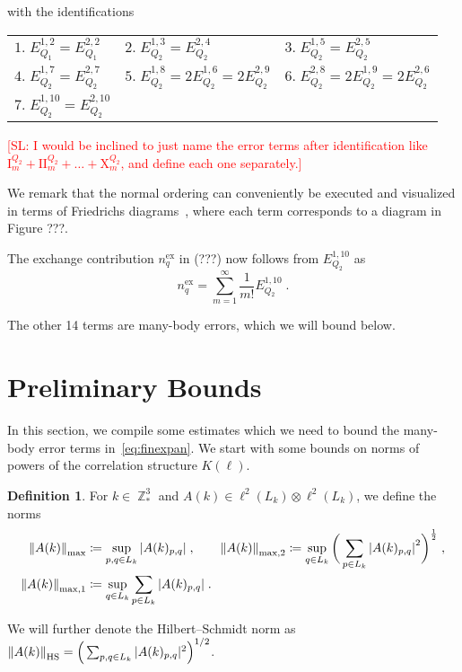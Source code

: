 \documentclass[12pt,a4paper]{article}
\numberwithin{equation}{section}
\newcommand{\1}{\mathbb{I}}
\newcommand{\ex}{\mathrm{ex}}
\newcommand{\HS}{\mathrm{HS}}
\DeclareMathOperator{\Z}{\mathbb{Z}}
\newcommand{\half}{\frac{1}{2}}
\theoremstyle{plain}
\theoremstyle{definition}
\newtheorem{definition}[theorem]{Definition}
\theoremstyle{remark}
\theoremstyle{plain}
\theoremstyle{definition}
\theoremstyle{remark}
\begin{document}
with the identifications\\
{\renewcommand{\arraystretch}{1.5}
	\begin{tabular}[t]{lll}
		 $\mathit{1.}\; E_{Q_1}^{1,2} = E_{Q_1}^{2,2}$\quad\quad& 
		 $\mathit{2.}\; E_{Q_2}^{1,3} = E_{Q_2}^{2,4}$\quad\quad&
		 $\mathit{3.}\; E_{Q_2}^{1,5} = E_{Q_2}^{2,5}$ \quad\quad\\
		 $\mathit{4.}\; E_{Q_2}^{1,7} = E_{Q_2}^{2,7}$\quad\quad&
		 $\mathit{5.}\; E_{Q_2}^{1,8} = 2E_{Q_2}^{1,6} =  2E_{Q_2}^{2,9}$\quad\quad&
		 $\mathit{6.}\; E_{Q_2}^{2,8} = 2E_{Q_2}^{1,9} = 2E_{Q_2}^{2,6}$\quad\quad\\
		 $\mathit{7.}\; E_{Q_2}^{1,10} = E_{Q_2}^{2,10}$\quad\quad
	 
\end{tabular}}

\textcolor{red}{[SL: I would be inclined to just name the error terms after identification like $ \mathrm{I}_m^{Q_2} + \mathrm{II}_m^{Q_2} + \ldots + \mathrm{X}_m^{Q_2} $, and define each one separately.]}

We remark that the normal ordering can conveniently be executed and visualized in terms of Friedrichs diagrams~\cite{BL23}, where each term corresponds to a diagram in Figure ???.



The exchange contribution $ n_q^{\ex} $ in (???) now follows from $ E_{Q_2}^{1,10} $ as
\begin{equation}
	n_q^{\ex}
	= \sum_{m=1}^\infty \frac{1}{m!} E_{Q_2}^{1,10} \;.
\end{equation}

The other 14 terms are many-body errors, which we will bound below.



\section{Preliminary Bounds}
\label{sec:prelim_bounds}

In this section, we compile some estimates which we need to bound the many-body error terms in~\eqref{eq:finexpan}. We start with some bounds on norms of powers of the correlation structure $ K(\ell) $.

\begin{definition}
For $k \in \Z^3_*$ and $A(k)\in \ell^2(L_k)\otimes \ell^2(L_k)$, we define the norms
\begin{equation}
\begin{aligned}
	\norm{A(k)}_{\max}
	&\coloneq \sup\limits_{p,q \in L_k}\abs{A(k)_{p,q}} \;, \qquad
	\norm{A(k)}_{\max,2}
	\coloneq \sup\limits_{q \in L_k}\bigg(\sum\limits_{p \in L_k}\abs{A(k)_{p,q}}^2\bigg)^\half \;, \\
	\norm{A(k)}_{\mathrm{max,1}}
	&\coloneq \sup\limits_{q \in L_k}\sum\limits_{p \in L_k}\abs{A(k)_{p,q}} \;.
\end{aligned}
\end{equation}
\end{definition}
We will further denote the Hilbert--Schmidt norm as $ \norm{A(k)}_{\HS} = \Big( \sum_{p,q \in L_k} |A(k)_{p,q}|^2 \Big)^{1/2} $.
\end{document}
